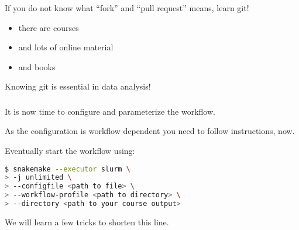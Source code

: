 \begin{frame}
  \frametitle{}
  If you do not know what ``fork'' and ``pull request'' means, learn git!
  \begin{itemize}[<+->]
   \item there are courses
   \item and lots of online material
   \item and books
  \end{itemize}
  \pause
  \begin{warning}
  	Knowing git is essential in data analysis!
  \end{warning}
\end{frame}

\begin{frame}[fragile]
  \frametitle{}
  It is now time to configure and parameterize the workflow.
  \pause
  \begin{hint}
  	As the configuration is workflow dependent you need to follow instructions, now.
  \end{hint}
  \pause
  Eventually start the workflow using:
  \begin{lstlisting}[language=Bash, style=Shell]
$ snakemake --executor slurm \
> -j unlimited \
> --configfile <path to file> \
> --workflow-profile <path to directory> \
> --directory <path to your course output>
  \end{lstlisting}
  \pause
  \begin{hint}
  	We will learn a few tricks to shorten this line.
  \end{hint}
\end{frame}

